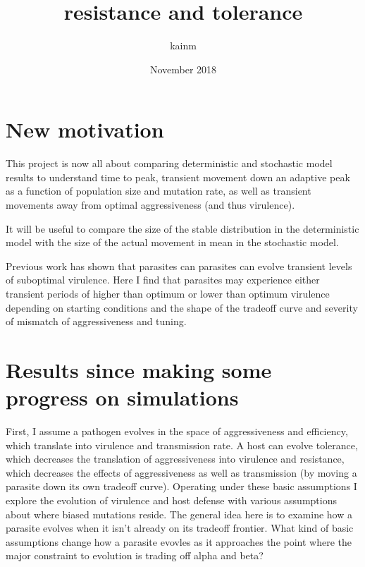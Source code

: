 \documentclass{article}
\title{resistance and tolerance}
\author{kainm}
\date{November 2018}
\begin{document}
\maketitle

\section*{New motivation}

This project is now all about comparing deterministic and stochastic model results to understand time to peak, transient movement down an adaptive peak as a function of population size and mutation rate, as well as transient movements away from optimal aggressiveness (and thus virulence).

It will be useful to compare the size of the stable distribution in the deterministic model with the size of the actual movement in mean in the stochastic model.

Previous work has shown that parasites can parasites can evolve transient levels of suboptimal virulence. Here I find that parasites may experience either transient periods of higher than optimum or lower than optimum virulence depending on starting conditions and the shape of the tradeoff curve and severity of mismatch of aggressiveness and tuning.

\section*{Results since making some progress on simulations}

First, I assume a pathogen evolves in the space of aggressiveness and efficiency, which translate into virulence and transmission rate. A host can evolve tolerance, which decreases the translation of aggressiveness into virulence and resistance, which decreases the effects of aggressiveness as well as transmission (by moving a parasite down its own tradeoff curve). Operating under these basic assumptions I explore the evolution of virulence and host defense with various assumptions about where biased mutations reside. The general idea here is to examine how a parasite evolves when it isn't already on its tradeoff frontier. What kind of basic assumptions change how a parasite evovles as it approaches the point where the major constraint to evolution is trading off alpha and beta?
\end{document}
